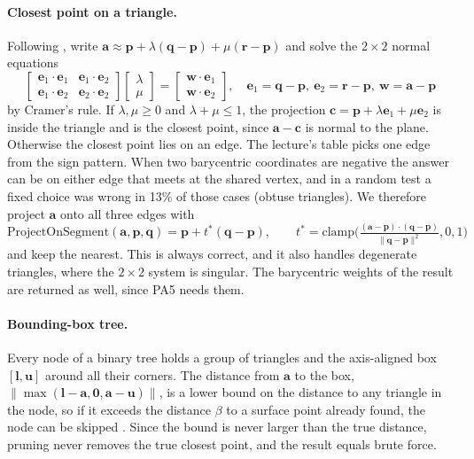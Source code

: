 \documentclass[10pt]{article}
\newcommand{\vect}[1]{\mathbf{#1}}
\begin{document}
\paragraph{Closest point on a triangle.} Following \cite{lecpairs}, write $\vect a\approx\vect p+\lambda(\vect q-\vect p)+\mu(\vect r-\vect p)$ and solve the $2\times2$ normal equations
\begin{equation}
\begin{bmatrix}\vect e_1\cdot\vect e_1&\vect e_1\cdot\vect e_2\\ \vect e_1\cdot\vect e_2&\vect e_2\cdot\vect e_2\end{bmatrix}
\begin{bmatrix}\lambda\\ \mu\end{bmatrix}=\begin{bmatrix}\vect w\cdot\vect e_1\\ \vect w\cdot\vect e_2\end{bmatrix},\quad \vect e_1=\vect q-\vect p,\ \vect e_2=\vect r-\vect p,\ \vect w=\vect a-\vect p
\end{equation}
by Cramer's rule. If $\lambda,\mu\ge0$ and $\lambda+\mu\le1$, the projection $\vect c=\vect p+\lambda\vect e_1+\mu\vect e_2$ is inside the triangle and is the closest point, since $\vect a-\vect c$ is normal to the plane. Otherwise the closest point lies on an edge. The lecture's table picks one edge from the sign pattern. When two barycentric coordinates are negative the answer can be on either edge that meets at the shared vertex, and in a random test a fixed choice was wrong in 13\% of those cases (obtuse triangles). We therefore project $\vect a$ onto all three edges with
\begin{equation}
\mathrm{ProjectOnSegment}(\vect a,\vect p,\vect q)=\vect p+t^*(\vect q-\vect p),\qquad t^*=\mathrm{clamp}\Big(\tfrac{(\vect a-\vect p)\cdot(\vect q-\vect p)}{\|\vect q-\vect p\|^2},0,1\Big)
\end{equation}
and keep the nearest. This is always correct, and it also handles degenerate triangles, where the $2\times2$ system is singular. The barycentric weights of the result are returned as well, since PA5 needs them.

\paragraph{Bounding-box tree.} Every node of a binary tree holds a group of triangles and the axis-aligned box $[\vect l,\vect u]$ around all their corners. The distance from $\vect a$ to the box, $\|\max(\vect l-\vect a,\vect 0,\vect a-\vect u)\|$, is a lower bound on the distance to any triangle in the node, so if it exceeds the distance $\beta$ to a surface point already found, the node can be skipped \cite{lecpairs}. Since the bound is never larger than the true distance, pruning never removes the true closest point, and the result equals brute force.
\end{document}
